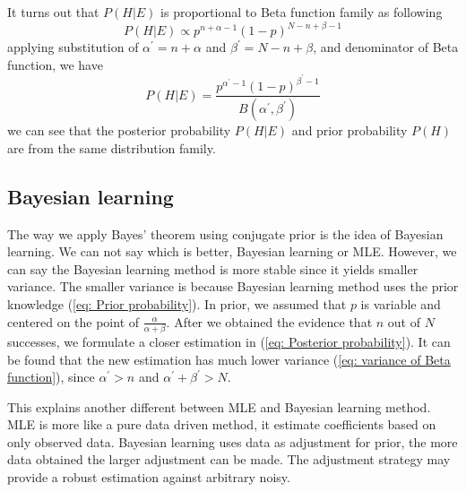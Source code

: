 \documentclass[a4paper]{article}
\begin{document}
It turns out that $P(H|E)$ is proportional to Beta function family as following
\begin{equation}
    P(H|E) \propto p^{n + \alpha - 1} (1-p)^{N - n + \beta - 1}
\end{equation}
applying substitution of $\alpha^{'} = n + \alpha$ and $\beta^{'} = N - n + \beta$, and denominator of Beta function, we have
\begin{equation}
    P(H|E) = \frac{p^{\alpha^{'}-1} (1-p)^{\beta^{'}-1}}{B(\alpha^{'}, \beta^{'})}
    \label{eq: Posterior probability}
\end{equation}
we can see that the posterior probability $P(H|E)$ and prior probability $P(H)$ are from the same distribution family.

\subsection{Bayesian learning}
The way we apply Bayes' theorem using conjugate prior is the idea of Bayesian learning.
We can not say which is better, Bayesian learning or MLE.
However, we can say the Bayesian learning method is more stable since it yields smaller variance.
The smaller variance is because Bayesian learning method uses the prior knowledge (\ref{eq: Prior probability}).
In prior, we assumed that $p$ is variable and centered on the point of $\frac{\alpha}{\alpha + \beta}$.
After we obtained the evidence that $n$ out of $N$ successes, we formulate a closer estimation in (\ref{eq: Posterior probability}).
It can be found that the new estimation has much lower variance (\ref{eq: variance of Beta function}), since $\alpha^{'} > n$ and $\alpha^{'} + \beta^{'} > N$.

This explains another different between MLE and Bayesian learning method.
MLE is more like a pure data driven method, it estimate coefficients based on only observed data.
Bayesian learning uses data as adjustment for prior, the more data obtained the larger adjustment can be made.
The adjustment strategy may provide a robust estimation against arbitrary noisy.
\end{document}
